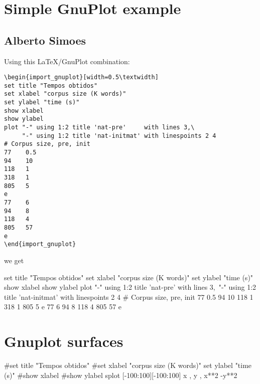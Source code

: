 \documentclass[a4paper]{article}
\begin{document}
\section*{Simple GnuPlot example}
\subsection*{Alberto Simoes}

Using this \LaTeX/GnuPlot combination:
\begin{verbatim}
\begin{import_gnuplot}[width=0.5\textwidth]
set title "Tempos obtidos"
set xlabel "corpus size (K words)"
set ylabel "time (s)"
show xlabel
show ylabel
plot "-" using 1:2 title 'nat-pre'     with lines 3,\
     "-" using 1:2 title 'nat-initmat' with linespoints 2 4
# Corpus size, pre, init
77    0.5
94    10 
118   1
318   1
805   5 
e
77    6
94    8
118   4
805   57
e
\end{import_gnuplot}
\end{verbatim}
we get

\begin{import_gnuplot}[width=0.5\textwidth]
set title "Tempos obtidos"
set xlabel "corpus size (K words)"
set ylabel "time (s)"
show xlabel
show ylabel
plot "-" using 1:2 title 'nat-pre'     with lines 3,\
     "-" using 1:2 title 'nat-initmat' with linespoints 2 4
# Corpus size, pre, init
77    0.5
94    10 
118   1
318   1
805   5 
e
77    6
94    8
118   4
805   57
e
\end{import_gnuplot}
 
\newpage

\section{Gnuplot surfaces}

\begin{import_gnuplot}[width=0.5\textwidth]
#set title "Tempos obtidos"
#set xlabel "corpus size (K words)"
set ylabel "time (s)"
#show xlabel
#show ylabel
splot [-100:100][-100:100] x , y , x**2 -y**2
\end{import_gnuplot}
\end{document}
